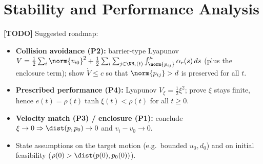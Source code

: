 \section{Stability and Performance Analysis}
\label{sec:analysis}
\textbf{[TODO]} Suggested roadmap:
\begin{itemize}
    \item \textbf{Collision avoidance (P2):} barrier-type Lyapunov
    $V=\frac12\sum_i\norm{v_{i0}}^2 + \frac12\sum_{i}\sum_{j\in\NN_i(t)}
    \int_{\norm{p_{ij}}}^\mu \alpha_r(s)\,ds$ (plus the enclosure term);
    show $\dot V\le c$ so that $\norm{p_{ij}}>d$ is preserved for all $t$.
    \item \textbf{Prescribed performance (P4):} Lyapunov
    $V_\xi=\frac12\xi^2$; prove $\xi$ stays finite, hence
    $e(t)=\rho(t)\tanh\xi(t)<\rho(t)$ for all $t\ge 0$.
    \item \textbf{Velocity match (P3) / enclosure (P1):} conclude
    $\xi\to 0\Rightarrow \dist(p,p_0)\to 0$ and $v_i-v_0\to 0$.
    \item State assumptions on the target motion (e.g.\ bounded
    $u_0,d_0$) and on initial feasibility ($\rho(0)>\dist(p(0),p_0(0))$).
\end{itemize}
